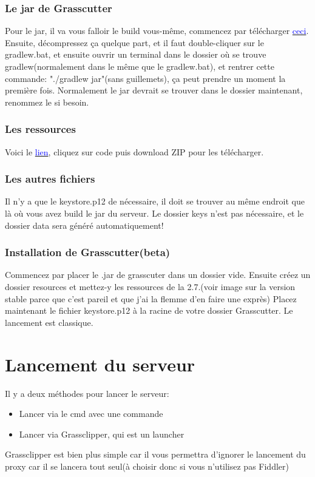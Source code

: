 \documentclass{article}
\begin{document}
\subsubsection{Le jar de Grasscutter}
Pour le jar, il va vous falloir le build vous-même, commencez par télécharger \href{https://github.com/Grasscutters/Grasscutter/archive/refs/heads/development.zip}{\textcolor{blue}{ceci}}.\newline
Ensuite, décompressez ça quelque part, et il faut double-cliquer sur le gradlew.bat, et ensuite ouvrir un terminal dans le dossier où se trouve gradlew(normalement dans le même que le gradlew.bat), et rentrer cette commande: "./gradlew jar"(sans guillemets), ça peut prendre un moment la première fois. Normalement le jar devrait se trouver dans le dossier maintenant, renommez le si besoin.

\subsubsection{Les ressources}
Voici le \href{https://github.com/Koko-boya/Grasscutter_Resources/tree/main}{\textcolor{blue}{lien}}, cliquez sur code puis download ZIP pour les télécharger.\newline

\subsubsection{Les autres fichiers}
Il n'y a que le keystore.p12 de nécessaire, il doit se trouver au même endroit que là où vous avez build le jar du serveur. Le dossier keys n'est pas nécessaire, et le dossier data sera généré automatiquement!

\subsubsection{Installation de Grasscutter(beta)}
Commencez par placer le .jar de grasscuter dans un dossier vide.\newline
Ensuite créez un dossier resources et mettez-y les ressources de la 2.7.(voir image sur la version stable parce que c'est pareil et que j'ai la flemme d'en faire une exprès)\newline
Placez maintenant le fichier keystore.p12 à la racine de votre dossier Grasscutter.	\newline
Le lancement est classique.

\hrulefill

\section{Lancement du serveur}
Il y a deux méthodes pour lancer le serveur:
\begin{itemize}
	\item Lancer via le cmd avec une commande
	\item Lancer via Grassclipper, qui est un launcher
\end{itemize}
Grassclipper est bien plus simple car il vous permettra d'ignorer le lancement du proxy car il se lancera tout seul(à choisir donc si vous n'utilisez pas Fiddler)
\end{document}
